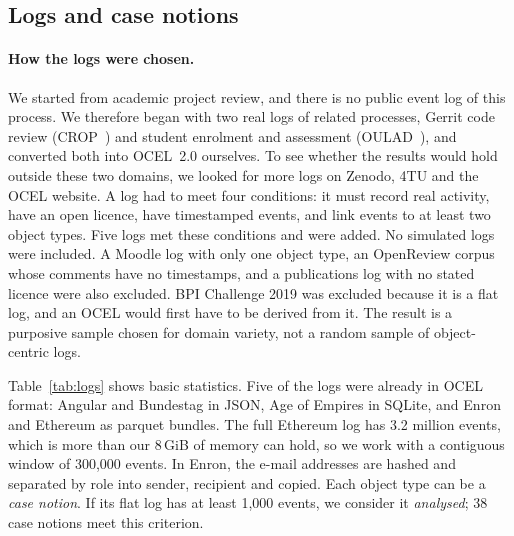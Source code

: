 \documentclass[pdflatex,sn-mathphys-num]{sn-jnl}
\begin{document}
\subsection{Logs and case notions}\label{sec:logs}

\paragraph{How the logs were chosen.} We started from academic project review, and there is no public event log of this process. We therefore began with two real logs of related processes, Gerrit code review (CROP~\cite{paixao2018crop}) and student enrolment and assessment (OULAD~\cite{kuzilek2017oulad}), and converted both into OCEL~2.0 ourselves. To see whether the results would hold outside these two domains, we looked for more logs on Zenodo, 4TU and the OCEL website. A log had to meet four conditions: it must record real activity, have an open licence, have timestamped events, and link events to at least two object types. Five logs met these conditions and were added. No simulated logs were included. A Moodle log with only one object type, an OpenReview corpus whose comments have no timestamps, and a publications log with no stated licence were also excluded. BPI Challenge 2019 was excluded because it is a flat log, and an OCEL would first have to be derived from it. The result is a purposive sample chosen for domain variety, not a random sample of object-centric logs.

Table~\ref{tab:logs} shows basic statistics. Five of the logs were already in OCEL format: Angular and Bundestag in JSON, Age of Empires in SQLite, and Enron and Ethereum as parquet bundles. The full Ethereum log has 3.2 million events, which is more than our 8\,GiB of memory can hold, so we work with a contiguous window of 300{,}000 events. In Enron, the e-mail addresses are hashed and separated by role into sender, recipient and copied. Each object type can be a \emph{case notion}. If its flat log has at least 1{,}000 events, we consider it \emph{analysed}; 38 case notions meet this criterion.
\end{document}
